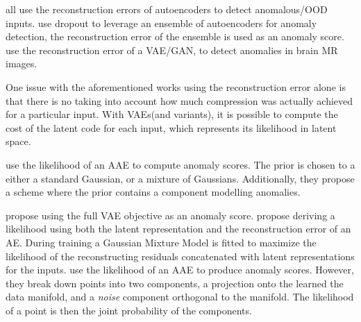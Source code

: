 \documentclass[../main.tex]{subfiles}
\begin{document}

\citet{xu2018unsupervised, an2015variational, borghesi2019anomaly} all use the reconstruction errors of autoencoders to detect anomalous/OOD inputs. 
\citet{chen2017outlier} use dropout to leverage an ensemble of autoencoders for anomaly detection, the reconstruction error of the ensemble is used as an anomaly score.
\citet{baur2018deep} use the reconstruction error of a VAE/GAN\citep{larsen2015autoencoding}, to detect anomalies in brain MR images. 

One issue with the aforementioned works using the reconstruction error alone is that there is no taking into account how much compression was actually achieved for a particular input.
With VAEs(and variants), it is possible to compute the cost of the latent code for each input, which represents its likelihood in latent space. 

\citet{leveau2017adversarial} use the likelihood of an AAE to compute anomaly scores. The prior is chosen to a either a standard Gaussian, or a mixture of Gaussians. Additionally, they propose a scheme where the prior contains a component modelling anomalies. 

\cite{vasilev2018q} propose using the full VAE objective as an anomaly score. \citet{zong2018deep} propose deriving a likelihood using both the latent representation and the reconstruction error of an AE. During training a Gaussian Mixture Model is fitted to maximize the likelihood of the reconstructing residuals concatenated with latent representations for the inputs. 
\citet{pidhorskyi2018generative} use the likelihood of an AAE to produce anomaly scores. However, they break down points into two components, a projection onto the learned the data manifold, and a \emph{noise} component orthogonal to the manifold. The likelihood of a point is then the joint probability of the components. 
\end{document}
